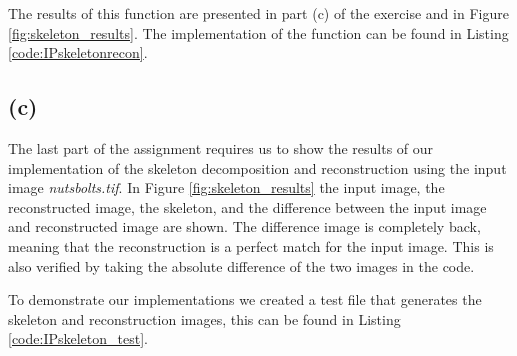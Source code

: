 \documentclass{article}
\begin{document}
The results of this function are presented in part (c) of the exercise and in Figure \ref{fig:skeleton_results}. The implementation of the function can be found in  Listing \ref{code:IPskeletonrecon}.

\subsection*{(c)}
The last part of the assignment requires us to show the results of our implementation of the skeleton decomposition and reconstruction using the input image \textit{nutsbolts.tif}. In Figure \ref{fig:skeleton_results} the input image, the reconstructed image, the skeleton, and the difference between the input image and reconstructed image are shown. The difference image is completely back, meaning that the reconstruction is a perfect match for the input image. This is also verified by taking the absolute difference of the two images in the code.

To demonstrate our implementations we created a test file that generates the skeleton and reconstruction images, this can be found in  Listing \ref{code:IPskeleton_test}.
\end{document}
